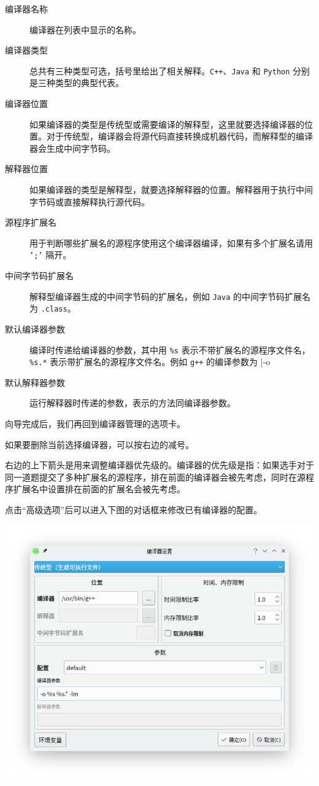 \documentclass[UTF-8]{ctexart}
\begin{document}
				\begin{description}
					\item[编译器名称] 编译器在列表中显示的名称。
					\item[编译器类型] 总共有三种类型可选，括号里给出了相关解释。\texttt{C++}、\texttt{Java} 和 \texttt{Python} 分别是三种类型的典型代表。
					\item[编译器位置] 如果编译器的类型是传统型或需要编译的解释型，这里就要选择编译器的位置。对于传统型，编译器会将源代码直接转换成机器代码，而解释型的编译器会生成中间字节码。
					\item[解释器位置] 如果编译器的类型是解释型，就要选择解释器的位置。解释器用于执行中间字节码或直接解释执行源代码。
					\item[源程序扩展名] 用于判断哪些扩展名的源程序使用这个编译器编译，如果有多个扩展名请用 \texttt{';'} 隔开。
					\item[中间字节码扩展名] 解释型编译器生成的中间字节码的扩展名，例如 \texttt{Java} 的中间字节码扩展名为 \texttt{.class}。
					\item[默认编译器参数] 编译时传递给编译器的参数，其中用 \texttt{\%s} 表示不带扩展名的源程序文件名，\texttt{\%s.*} 表示带扩展名的源程序文件名。例如 \texttt{g++} 的编译参数为
						|-o %
					\item[默认解释器参数] 运行解释器时传递的参数，表示的方法同编译器参数。
				\end{description}

				向导完成后，我们再回到编译器管理的选项卡。

				如果要删除当前选择编译器，可以按右边的减号。

				右边的上下箭头是用来调整编译器优先级的。编译器的优先级是指：如果选手对于同一道题提交了多种扩展名的源程序，排在前面的编译器会被先考虑，同时在源程序扩展名中设置排在前面的扩展名会被先考虑。

				点击“高级选项”后可以进入下图的对话框来修改已有编译器的配置。

				\begin{center}
				\includegraphics[scale=0.7]{pics/compilersettings2.png}
				\end{center}
\end{document}
